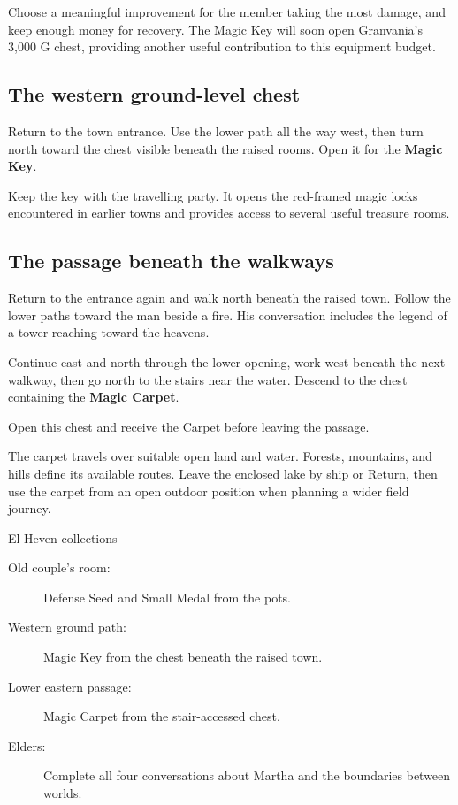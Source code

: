 Choose a meaningful improvement for the member taking the most damage,
and keep enough money for recovery. The Magic Key will soon open
Granvania's 3,000 G chest, providing another useful contribution
to this equipment budget.

\subsection*{The western ground-level chest}

Return to the town entrance. Use the lower path all the way west,
then turn north toward the chest visible beneath the raised rooms.
Open it for the \textbf{Magic Key}.

Keep the key with the travelling party. It opens the red-framed
magic locks encountered in earlier towns and provides access to
several useful treasure rooms.

\subsection*{The passage beneath the walkways}

Return to the entrance again and walk north beneath the raised town.
Follow the lower paths toward the man beside a fire. His conversation
includes the legend of a tower reaching toward the heavens.

Continue east and north through the lower opening, work west beneath
the next walkway, then go north to the stairs near the water.
Descend to the chest containing the \textbf{Magic Carpet}.

Open this chest and receive the Carpet before leaving the passage.


The carpet travels over suitable open land and water. Forests,
mountains, and hills define its available routes. Leave the enclosed
lake by ship or Return, then use the carpet from an open outdoor
position when planning a wider field journey.

\begin{routecheck}{El Heven collections}
\begin{description}
  \item[Old couple's room:] Defense Seed and Small Medal from the pots.
  \item[Western ground path:] Magic Key from the chest beneath
    the raised town.
  \item[Lower eastern passage:] Magic Carpet from the stair-accessed chest.
  \item[Elders:] Complete all four conversations about Martha and
    the boundaries between worlds.
\end{description}
\end{routecheck}

